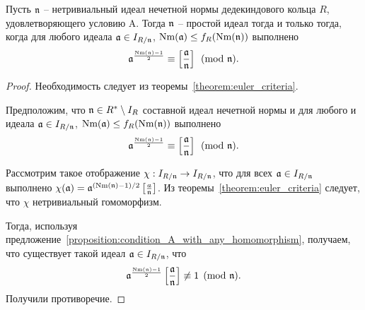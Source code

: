 \documentclass[_00_dissertation.tex]{subfiles}
\begin{document}
\begin{theorem}\label{theorem:euler_criteria_deterministic}
    Пусть $\mathfrak{n}$ -- нетривиальный идеал нечетной нормы дедекиндового кольца $R$, удовлетворяющего условию A.
    Тогда $\mathfrak{n}$ -- простой идеал тогда и только тогда, когда для любого идеала $\mathfrak{a} \in I_{R/\mathfrak{n}}$, $\textrm{Nm}(\mathfrak{a}) \le f_R(\textrm{Nm}(\mathfrak{n}))$ выполнено
    \begin{equation*}
        \mathfrak{a}^{\frac{\textrm{Nm}(\mathfrak{n}) - 1}{2}} \equiv \left[\frac{\mathfrak{a}}{\mathfrak{n}}\right] \pmod{\mathfrak{n}}.
    \end{equation*}
\end{theorem}
\begin{proof}
    Необходимость следует из теоремы~\ref{theorem:euler_criteria}.
    
    Предположим, что $\mathfrak{n} \in R^{*} \setminus I_{R}$ составной идеал нечетной нормы и для любого и идеала $\mathfrak{a} \in I_{R/\mathfrak{n}}$, $\textrm{Nm}(\mathfrak{a}) \le f_R(\textrm{Nm}(\mathfrak{n}))$ выполнено
    \begin{equation*}
        \mathfrak{a}^{\frac{\textrm{Nm}(\mathfrak{n}) - 1}{2}} \equiv \left[\frac{\mathfrak{a}}{\mathfrak{n}}\right] \pmod{\mathfrak{n}}.
    \end{equation*}
    
    Рассмотрим такое отображение $\chi: I_{R/\mathfrak{n}} \to I_{R/\mathfrak{n}}$, что для всех $\mathfrak{a} \in I_{R/\mathfrak{n}}$ выполнено $\chi(\mathfrak{a}) = \mathfrak{a}^{(\textrm{Nm}(\mathfrak{n}) - 1)/2}\left[\frac{a}{\mathfrak{n}}\right]$.
    Из теоремы~\ref{theorem:euler_criteria} следует, что $\chi$ нетривиальный гомоморфизм.
    
    Тогда, используя предложение~\ref{proposition:condition_A_with_any_homomorphism}, получаем, что существует такой идеал $\mathfrak{a} \in I_{R/\mathfrak{n}}$, что
    \begin{equation*}
        \mathfrak{a}^{\frac{\textrm{Nm}(\mathfrak{n}) - 1}{2}} \left[\frac{\mathfrak{a}}{\mathfrak{n}}\right] \not\equiv 1 \pmod{\mathfrak{n}}.
    \end{equation*}
    Получили противоречие.
\end{proof}
\end{document}
